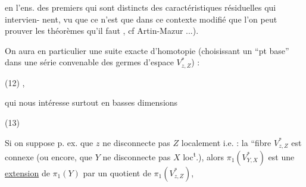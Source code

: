 en l'ens. des  premiers qui sont distincts
des caractéristiques résiduelles qui intervien-
nent, vu que ce n'est que dans ce
contexte modifié que l'on peut prouver
les théorèmes qu'il faut ,
cf Artin-Mazur ...).

On aura en particulier une suite
exacte d'homotopie  (choisissant
un  ``pt base'' dans une série
convenable  des germes d'espace $V^*_{z,Z}$) :

\noindent (12)
,

qui nous intéresse surtout en basses
dimensions

\noindent (13)

Si on suppose p. ex. que $z$ ne disconnecte
pas $Z$ localement i.e. :  la ``fibre $V^*_{z,Z}$ est connexe
(ou encore, que $Y$ ne disconnecte pas $X$
loc\textsuperscript{t}.), alors $\pi_1(V^*_{Y,X})$ est une \uline{extension}
de $\pi_1(Y)$ par un quotient de $\pi_1(V^*_{z,Z})$, 
